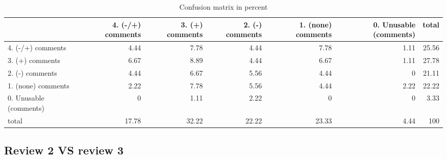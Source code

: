 \documentclass{article}
\begin{document}
\begin{table}[H]

\centering

\begin{tabular}{lrrrrrr}
\hline
                        &   4. (-/+) comments &   3. (+) comments &   2. (-) comments &   1. (none) comments &   0. Unusable (comments) &   total \\
\hline
 4. (-/+) comments      &                4.44 &              7.78 &              4.44 &                 7.78 &                     1.11 &   25.56 \\
 3. (+) comments        &                6.67 &              8.89 &              4.44 &                 6.67 &                     1.11 &   27.78 \\
 2. (-) comments        &                4.44 &              6.67 &              5.56 &                 4.44 &                     0    &   21.11 \\
 1. (none) comments     &                2.22 &              7.78 &              5.56 &                 4.44 &                     2.22 &   22.22 \\
 0. Unusable (comments) &                0    &              1.11 &              2.22 &                 0    &                     0    &    3.33 \\
 total                  &               17.78 &             32.22 &             22.22 &                23.33 &                     4.44 &  100    \\
\hline
\end{tabular}\caption{Confusion matrix in percent}

\end{table}



\subsection{Review 2 VS review 3} 
\end{document}
